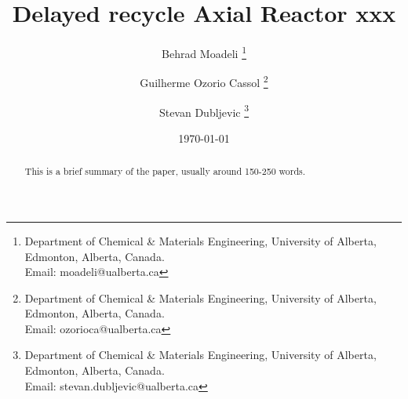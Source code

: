 \documentclass[letterpaper,11pt]{article}
\title{Delayed recycle Axial Reactor xxx}
\author{
  Behrad Moadeli \thanks{Department of Chemical \& Materials Engineering, University of Alberta, Edmonton, Alberta, Canada. \\Email: moadeli@ualberta.ca} \and
  Guilherme Ozorio Cassol \thanks{Department of Chemical \& Materials Engineering, University of Alberta, Edmonton, Alberta, Canada. \\Email: ozorioca@ualberta.ca} \and
  Stevan Dubljevic \thanks{Department of Chemical \& Materials Engineering, University of Alberta, Edmonton, Alberta, Canada. \\Email: stevan.dubljevic@ualberta.ca}
}
\date{\today}
\begin{document}
\maketitle

\begin{abstract}
    This is a brief summary of the paper, usually around 150-250 words. \lipsum[1-1]
\end{abstract}

  
  
  
  
  
  
  
  

  
  
  \printbibliography

\end{document}
